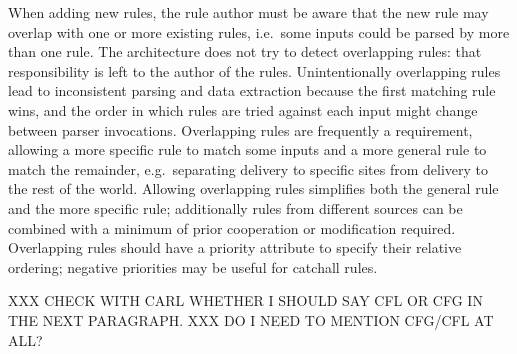 When adding new rules, the rule author must be aware that the new rule may
overlap with one or more existing rules, i.e.\ some inputs could be parsed
by more than one rule.  The architecture does not try to detect overlapping
rules: that responsibility is left to the author of the rules.
Unintentionally overlapping rules lead to inconsistent parsing and data
extraction because the first matching rule wins, and the order in which
rules are tried against each input might change between parser invocations.
Overlapping rules are frequently a requirement, allowing a more specific
rule to match some inputs and a more general rule to match the remainder,
e.g.\ separating  delivery to specific sites from
 delivery to the rest of the world.  Allowing overlapping
rules simplifies both the general rule and the more specific rule;
additionally rules from different sources can be combined with a minimum of
prior cooperation or modification required.  Overlapping rules should have
a priority attribute to specify their relative ordering; negative
priorities may be useful for catchall rules.

XXX CHECK WITH CARL WHETHER I SHOULD SAY CFL OR CFG IN THE NEXT
PARAGRAPH\@.  XXX DO I NEED TO MENTION CFG/CFL AT ALL\@?

